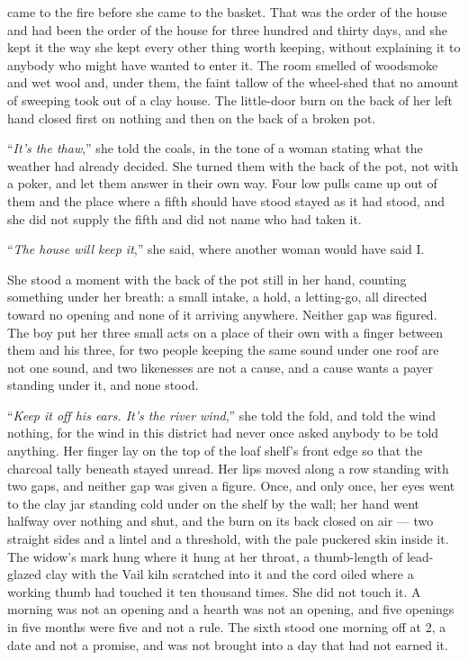  came to the fire before she came to the basket. That was the order of the house and had been the order of the house for three hundred and thirty days, and she kept it the way she kept every other thing worth keeping, without explaining it to anybody who might have wanted to enter it. The room smelled of woodsmoke and wet wool and, under them, the faint tallow of the wheel-shed that no amount of sweeping took out of a clay house. The little-door burn on the back of her left hand closed first on nothing and then on the back of a broken pot.

“\emph{It's the thaw},” she told the coals, in the tone of a woman stating what the weather had already decided. She turned them with the back of the pot, not with a poker, and let them answer in their own way. Four low pulls came up out of them and the place where a fifth should have stood stayed as it had stood, and she did not supply the fifth and did not name who had taken it.

“\emph{The house will keep it},” she said, where another woman would have said I.

She stood a moment with the back of the pot still in her hand, counting something under her breath: a small intake, a hold, a letting-go, all directed toward no opening and none of it arriving anywhere. Neither gap was figured. The boy put her three small acts on a place of their own with a finger between them and his three, for two people keeping the same sound under one roof are not one sound, and two likenesses are not a cause, and a cause wants a payer standing under it, and none stood.

“\emph{Keep it off his ears. It's the river wind},” she told the fold, and told the wind nothing, for the wind in this district had never once asked anybody to be told anything. Her finger lay on the top of the loaf shelf's front edge so that the charcoal tally beneath stayed unread. Her lips moved along a row standing with two gaps, and neither gap was given a figure. Once, and only once, her eyes went to the clay jar standing cold under  on the shelf by the wall; her hand went halfway over nothing and shut, and the burn on its back closed on air --- two straight sides and a lintel and a threshold, with the pale puckered skin inside it. The widow's mark hung where it hung at her throat, a thumb-length of lead-glazed clay with the Vail kiln scratched into it and the cord oiled where a working thumb had touched it ten thousand times. She did not touch it. A morning was not an opening and a hearth was not an opening, and five openings in five months were five and not a rule. The sixth stood one morning off at  2, a date and not a promise, and was not brought into a day that had not earned it.

